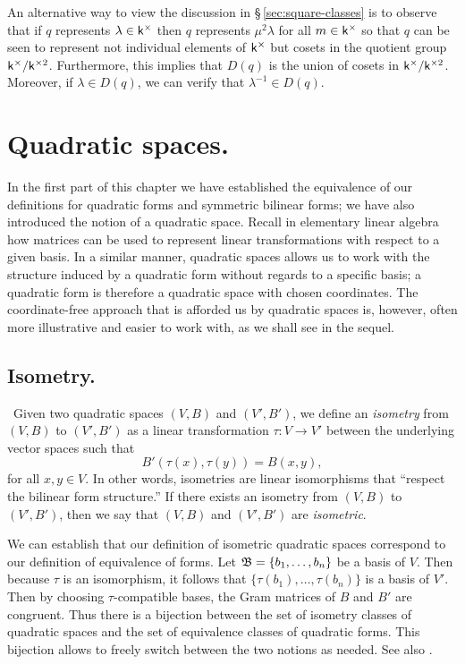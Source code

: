 An alternative way to view the discussion in \S\,\ref{sec:square-classes} is to
observe that if \(q\) represents \(\lambda \in \mathsf{k}^{\times}\) then \(q\)
represents \(\mu^2\lambda\) for all \(m \in \mathsf{k}^{\times}\) so that \(q\) can
be seen to represent not individual elements of \(\mathsf{k}^{\times}\) but cosets
in the quotient group \(\mathsf{k}^{\times} / \mathsf{k}^{\times 2}\). Furthermore, this
implies that \(D(q)\) is the union of cosets in \(\mathsf{k}^{\times} /
\mathsf{k}^{\times 2}\). Moreover, if \(\lambda \in D(q)\), we can verify that
\(\lambda^{-1} \in D(q)\).

\section{Quadratic spaces.}

In the first part of this chapter we have established the equivalence of our
definitions for quadratic forms and symmetric bilinear forms; we have also
introduced the notion of a quadratic space. Recall in elementary linear algebra
how matrices can be used to represent linear transformations with respect to a
given basis. In a similar manner, quadratic spaces allows us to work with the
structure induced by a quadratic form without regards to a specific basis; a
quadratic form is therefore a quadratic space with chosen coordinates. The
coordinate-free approach that is afforded us by quadratic spaces is, however,
often more illustrative and easier to work with, as we shall see in the sequel.

\subsection{Isometry.}~Given two quadratic spaces \((V, B)\) and \((V', B')\),
we define an \emph{isometry} from \((V, B)\) to \((V', B')\) as a linear
transformation \(\tau : V \to V'\) between the underlying vector spaces such
that
\[
  B'(\tau(x), \tau(y)) = B(x, y),
\]
for all \(x, y \in V\). In other words, isometries are linear isomorphisms that
``respect the bilinear form structure.'' \cite{clarkquadratic} If there exists
an isometry from \((V, B)\) to \((V', B')\), then we say that \((V, B)\) and
\((V', B')\) are \emph{isometric}.\label{sec:isometry}

We can establish that our definition of isometric quadratic spaces correspond to
our definition of equivalence of forms. Let \(\mathfrak{B} = \{b_1, \dots, b_n\}\) be
a basis of \(V\). Then because \(\tau\) is an isomorphism, it follows that
\(\{\tau(b_1), \dots, \tau(b_n)\}\) is a basis of \(V'\). Then by choosing
\(\tau\)-compatible bases, the Gram matrices of \(B\) and \(B'\) are congruent.
Thus there is a bijection between the set of isometry classes of quadratic
spaces and the set of equivalence classes of quadratic forms. This bijection
allows to freely switch between the two notions as needed. See also
\cite[p.~39--40]{szymiczek2017bilinear}.


